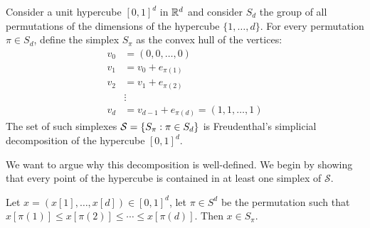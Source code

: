 \begin{definition}\label{def:freudenthal_simplicial_decomposition}
	Consider a unit hypercube ${[0, 1]}^d$ in $\mathbb{R}^d$ and consider $S_d$ the group of all permutations of the dimensions of the hypercube $\{1, \dots, d\}$. For every permutation $\pi \in S_d$, define the simplex $S_{\pi}$ as the convex hull of the vertices:
	\begin{align*}
		v_0 & = (0, 0, \dots, 0)                        \\
		v_1 & = v_0 + e_{\pi(1)}                        \\
		v_2 & = v_1 + e_{\pi(2)}                        \\
		    & \vdots                                    \\
		v_d & = v_{d-1} + e_{\pi(d)} = (1, 1, \dots, 1)
	\end{align*}
	The set of such simplexes $\mathcal{S} = \left\{S_{\pi} : \pi \in S_d\right\}$ is Freudenthal's simplicial decomposition of the hypercube ${[0, 1]}^d$.
\end{definition}
We want to argue why this decomposition is well-defined. We begin by showing that every point of the hypercube is contained in at least one simplex of $\mathcal{S}$.
\begin{lemma}\label{lem:caracterisation_of_simplices}
	Let $x = (x[1], \dots, x[d]) \in {[0, 1]}^d$, let $\pi \in S^d$ be the permutation such that $x[\pi(1)] \leq x[\pi(2)] \leq \cdots \leq x[\pi(d)]$. Then $x \in S_{\pi}$.
\end{lemma}
